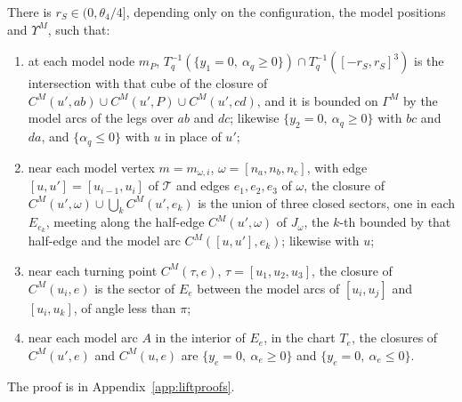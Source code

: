 \begin{lemma}\label{lem:place}
There is $r_S\in(0,\theta_4/4]$, depending only on the configuration, the model positions and $\Upsilon^M$, such that:
\begin{enumerate}
\item at each model node $m_P$, $T_q^{-1}(\{y_1=0,\ \alpha_q\ge0\})\cap T_q^{-1}([-r_S,r_S]^3)$ is the intersection with
that cube of the closure of $C^M(u',ab)\cup C^M(u',P)\cup C^M(u',cd)$, and it is bounded on $\Gamma^M$ by the model arcs of
the legs over $ab$ and $dc$; likewise $\{y_2=0,\ \alpha_q\ge0\}$ with $bc$ and $da$, and $\{\alpha_q\le0\}$ with $u$ in
place of $u'$;
\item near each model vertex $m=m_{\omega,i}$, $\omega=[n_a,n_b,n_c]$, with edge $[u,u']=[u_{i-1},u_i]$ of $\mathcal T$ and
edges $e_1,e_2,e_3$ of $\omega$, the closure of $C^M(u',\omega)\cup\bigcup_kC^M(u',e_k)$ is the union of three closed
sectors, one in each $E_{e_k}$, meeting along the half-edge $C^M(u',\omega)$ of $J_\omega$, the $k$-th bounded by that
half-edge and the model arc $C^M([u,u'],e_k)$; likewise with $u$;
\item near each turning point $C^M(\tau,e)$, $\tau=[u_1,u_2,u_3]$, the closure of $C^M(u_i,e)$ is the sector of $E_e$ between
the model arcs of $[u_i,u_j]$ and $[u_i,u_k]$, of angle less than $\pi$;
\item near each model arc $A$ in the interior of $E_e$, in the chart $T_e$, the closures of $C^M(u',e)$ and $C^M(u,e)$ are
$\{y_e=0,\ \alpha_e\ge0\}$ and $\{y_e=0,\ \alpha_e\le0\}$.
\end{enumerate}
\end{lemma}

The proof is in Appendix~\ref{app:liftproofs}.

